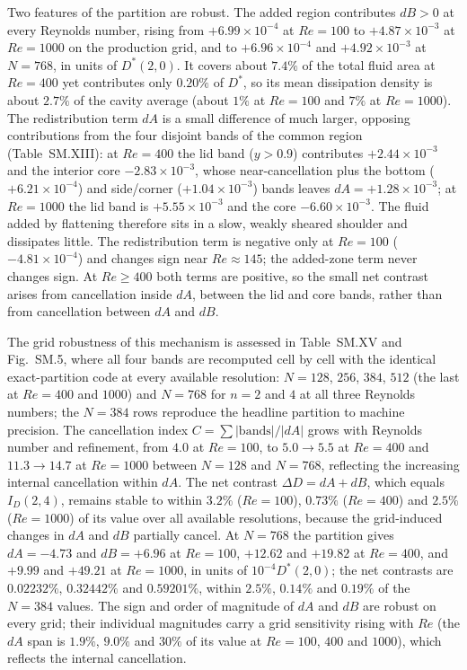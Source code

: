 Two features of the partition are robust. The added region contributes $dB>0$ at every Reynolds number, rising from $+6.99\times10^{-4}$ at $Re=100$ to $+4.87\times10^{-3}$ at $Re=1000$ on the production grid, and to $+6.96\times10^{-4}$ and $+4.92\times10^{-3}$ at $N=768$, in units of $D^*(2,0)$. It covers about $7.4\%$ of the total fluid area at $Re=400$ yet contributes only $0.20\%$ of $D^*$, so its mean dissipation density is about $2.7\%$ of the cavity average (about $1\%$ at $Re=100$ and $7\%$ at $Re=1000$). The redistribution term $dA$ is a small difference of much larger, opposing contributions from the four disjoint bands of the common region (Table~SM.XIII): at $Re=400$ the lid band ($y>0.9$) contributes $+2.44\times10^{-3}$ and the interior core $-2.83\times10^{-3}$, whose near-cancellation plus the bottom ($+6.21\times10^{-4}$) and side/corner ($+1.04\times10^{-3}$) bands leaves $dA=+1.28\times10^{-3}$; at $Re=1000$ the lid band is $+5.55\times10^{-3}$ and the core $-6.60\times10^{-3}$. The fluid added by flattening therefore sits in a slow, weakly sheared shoulder and dissipates little. The redistribution term is negative only at $Re=100$ ($-4.81\times10^{-4}$) and changes sign near $Re\approx145$; the added-zone term never changes sign. At $Re\ge400$ both terms are positive, so the small net contrast arises from cancellation inside $dA$, between the lid and core bands, rather than from cancellation between $dA$ and $dB$.

The grid robustness of this mechanism is assessed in Table~SM.XV and Fig.~SM.5, where all four bands are recomputed cell by cell with the identical exact-partition code at every available resolution: $N=128$, $256$, $384$, $512$ (the last at $Re=400$ and $1000$) and $N=768$ for $n=2$ and $4$ at all three Reynolds numbers; the $N=384$ rows reproduce the headline partition to machine precision. The cancellation index $C=\sum|\text{bands}|/|dA|$ grows with Reynolds number and refinement, from $4.0$ at $Re=100$, to $5.0\to5.5$ at $Re=400$ and $11.3\to14.7$ at $Re=1000$ between $N=128$ and $N=768$, reflecting the increasing internal cancellation within $dA$. The net contrast $\Delta D=dA+dB$, which equals $I_D(2,4)$, remains stable to within $3.2\%$ ($Re=100$), $0.73\%$ ($Re=400$) and $2.5\%$ ($Re=1000$) of its value over all available resolutions, because the grid-induced changes in $dA$ and $dB$ partially cancel. At $N=768$ the partition gives $dA=-4.73$ and $dB=+6.96$ at $Re=100$, $+12.62$ and $+19.82$ at $Re=400$, and $+9.99$ and $+49.21$ at $Re=1000$, in units of $10^{-4}D^*(2,0)$; the net contrasts are $0.02232\%$, $0.32442\%$ and $0.59201\%$, within $2.5\%$, $0.14\%$ and $0.19\%$ of the $N=384$ values. The sign and order of magnitude of $dA$ and $dB$ are robust on every grid; their individual magnitudes carry a grid sensitivity rising with $Re$ (the $dA$ span is $1.9\%$, $9.0\%$ and $30\%$ of its value at $Re=100$, $400$ and $1000$), which reflects the internal cancellation.

